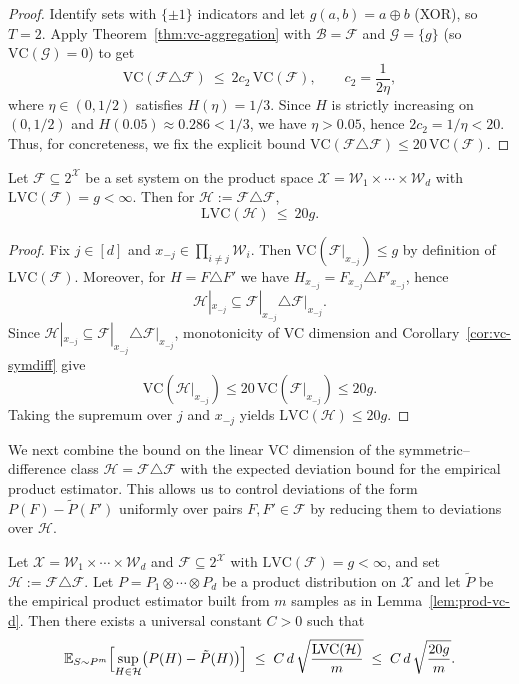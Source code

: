 \documentclass[arxiv]{colt2026}
\newcommand{\X}{\mathcal{X}}
\newcommand{\F}{\mathcal{F}}
\newcommand{\W}{\mathcal{W}}
\newcommand{\Hc}{\mathcal{H}}
\newcommand{\E}{\mathbb{E}}
\newcommand{\VC}{\mathrm{VC}}
\newcommand{\LVC}{\mathrm{LVC}}
\begin{document}
\begin{proof}
Identify sets with $\{\pm1\}$ indicators and let $g(a,b)=a\oplus b$ (XOR), so $T=2$.
Apply Theorem~\ref{thm:vc-aggregation} with $\mathcal B=\F$ and
$\mathcal G=\{g\}$ (so $\VC(\mathcal G)=0$) to get
\[
\VC(\F\triangle\F)\ \le\ 2c_2\,\VC(\F),
\qquad c_2=\frac{1}{2\eta},
\]
where $\eta\in(0,1/2)$ satisfies $H(\eta)=1/3$.
Since $H$ is strictly increasing on $(0,1/2)$ and $H(0.05)\approx 0.286<1/3$, we have
$\eta>0.05$, hence $2c_2=1/\eta<20$.
Thus, for concreteness, we fix the explicit bound
$\VC(\F\triangle\F)\le 20\,\VC(\F)$.
\end{proof}


\begin{lemma}\label{lem:lvc-symdiff}
Let $\F \subseteq 2^\X$ be a set system on the product space
$\X = \W_1\times\cdots\times\W_d$ with $\LVC(\F)=g<\infty$.
Then for $\Hc:=\F\triangle\F$,
\[
\LVC(\Hc)\ \le\ 20g.
\]
\end{lemma}

\begin{proof}
Fix $j\in[d]$ and $x_{-j}\in\prod_{i\neq j}\W_i$.
Then $\VC(\F|_{x_{-j}})\le g$ by definition of $\LVC(\F)$.
Moreover, for $H=F\triangle F'$ we have
$H_{x_{-j}}=F_{x_{-j}}\triangle F'_{x_{-j}}$, hence
\[
\Hc|_{x_{-j}}
\subseteq
\F|_{x_{-j}}\triangle \F|_{x_{-j}}.
\]
Since
$\Hc|_{x_{-j}}\subseteq \F|_{x_{-j}}\triangle \F|_{x_{-j}}$,
monotonicity of VC dimension and Corollary~\ref{cor:vc-symdiff} give
\[
\VC(\Hc|_{x_{-j}})
\le
20\,\VC(\F|_{x_{-j}})
\le
20g.
\]
Taking the supremum over $j$ and $x_{-j}$ yields $\LVC(\Hc)\le 20g$.
\end{proof}

\noindent
We next combine the bound on the linear VC dimension of the symmetric--difference
class $\Hc=\F\triangle\F$ with the expected deviation bound for the empirical
product estimator.
This allows us to control deviations of the form $P(F)-\tilde P(F')$
uniformly over pairs $F,F'\in\F$ by reducing them to deviations over $\Hc$.

\begin{lemma}[Expected product deviation for $\Hc$]\label{lem:prod-vc-symdiff-expect}
Let $\X=\W_1\times\cdots\times\W_d$ and $\F\subseteq 2^\X$ with $\LVC(\F)=g<\infty$,
and set $\Hc := \F\triangle\F$.
Let $P=P_1\otimes\cdots\otimes P_d$ be a product distribution on $\X$ and
let $\tilde P$ be the empirical product estimator built from $m$ samples
as in Lemma~\ref{lem:prod-vc-d}.
Then there exists a universal constant $C>0$ such that
\[
\E_{S\sim P^{m}}
\Bigl[
\sup_{H\in \Hc} \bigl(P(H) - \tilde P(H)\bigr)
\Bigr]
\;\le\;
C\,d\,\sqrt{\frac{\LVC(\Hc)}{m}}
\;\le\;
C\,d\,\sqrt{\frac{20g}{m}}.
\]
\end{lemma}
\end{document}
